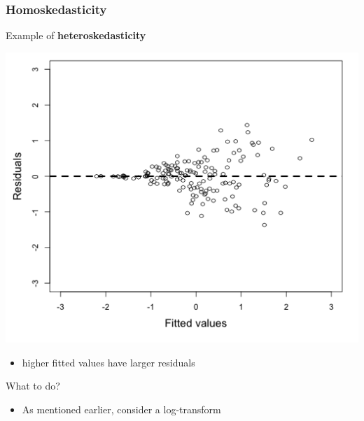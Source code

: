 \documentclass[10p]{beamer}\usepackage[]{graphicx}\usepackage[]{color}
\begin{document}
\begin{frame}
\frametitle{Homoskedasticity}
Example of \textbf{heteroskedasticity}
\begin{center}
\includegraphics[scale=.25]{figure/fig2}
\end{center}
\begin{itemize}
\item higher fitted values have larger residuals
\end{itemize}

What to do?
\begin{itemize}
\item As mentioned earlier, consider a \alert{log-transform}
\end{itemize}
\end{frame}
\end{document}
